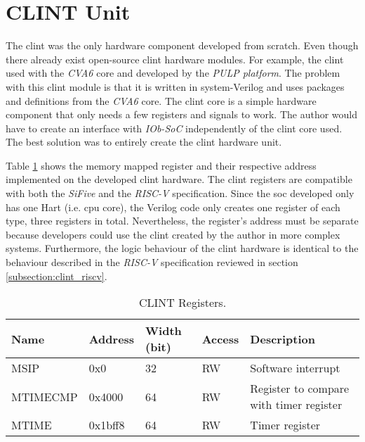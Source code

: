 \section{CLINT Unit}
\label{section:clint}
The \acrshort{clint} was the only hardware component developed from scratch. Even though there already exist open-source \acrfull{clint} hardware modules. For example, the \acrshort{clint} used with the \textit{CVA6} core and developed by the \textit{PULP platform}. The problem with this \acrshort{clint} module is that it is written in system-Verilog and uses packages and definitions from the \textit{CVA6} core. The \acrshort{clint} core is a simple hardware component that only needs a few registers and signals to work. The author would have to create an interface with \textit{IOb-SoC} independently of the \acrshort{clint} core used. The best solution was to entirely create the \acrshort{clint} hardware unit.

Table \ref{tab:clint_registers} shows the memory mapped register and their respective address implemented on the developed \acrshort{clint} hardware. The \acrshort{clint} registers are compatible with both the \textit{SiFive} and the \textit{RISC-V} specification. Since the \acrshort{soc} developed only has one Hart (i.e. \acrshort{cpu} core), the Verilog code only creates one register of each type, three registers in total. Nevertheless, the register's address must be separate because developers could use the \acrshort{clint} created by the author in more complex systems. Furthermore, the logic behaviour of the \acrshort{clint} hardware is identical to the behaviour described in the \textit{RISC-V} specification reviewed in section \ref{subsection:clint_riscv}.

\begin{table}[!ht]
  \centering
  \begin{tabular}{|l|l|l|l|l|}
  \hline
  \textbf{Name} & \textbf{Address} & \textbf{Width (bit)} & \textbf{Access} & \textbf{Description}                    \\ \hline
  MSIP          & 0x0              & 32                   & RW              & Software interrupt                      \\ \hline
  MTIMECMP      & 0x4000           & 64                   & RW              & Register to compare with timer register \\ \hline
  MTIME         & 0x1bff8          & 64                   & RW              & Timer register                          \\ \hline
  \end{tabular}
  \caption{CLINT Registers.}
  \label{tab:clint_registers}
\end{table}

